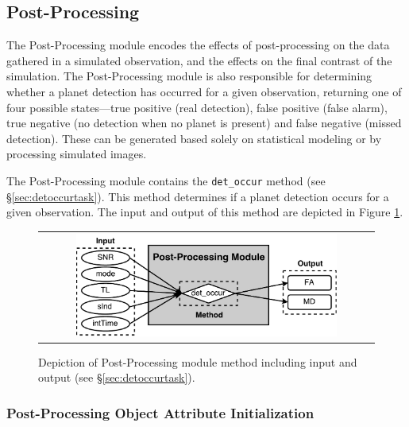 \documentclass[cleanfoot]{asme2ej}
\newcommand{\reffig}[1]{Figure \ref{#1}}
\begin{document}

\subsection{Post-Processing}\label{sec:postprocessing}
The Post-Processing module encodes the effects of post-processing on the data gathered in a simulated observation, and the effects on the final contrast of the simulation.  The Post-Processing module is also responsible for determining whether a planet detection has occurred for a given observation, returning one of four possible states---true positive (real detection), false positive (false alarm), true negative (no detection when no planet is present) and false negative (missed detection).  These can be generated based solely on statistical modeling or by processing simulated images.

The Post-Processing module contains the \verb+det_occur+ method (see \S\ref{sec:detoccurtask}).  This method determines if a planet detection occurs for a given observation.  The input and output of this method are depicted in \reffig{fig:postprocessingmodule}.

\begin{figure}[ht]
    \begin{center}
        \begin{tabular}{c}
            \includegraphics[width=0.8\textwidth]{PostProcessing2}
        \end{tabular}
    \end{center}
    \caption{\label{fig:postprocessingmodule} Depiction of Post-Processing module method including input and output (see \S\ref{sec:detoccurtask}).}
\end{figure}

\subsubsection{Post-Processing Object Attribute Initialization}
\end{document}
